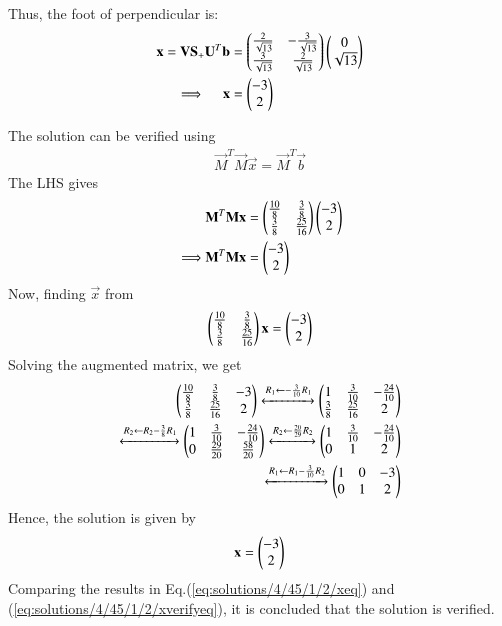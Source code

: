 Thus, the foot of perpendicular is:
\begin{align}
\mathbf{x} = \mathbf{V}\mathbf{S}_{+}\mathbf{U}^T\mathbf{b} 
	&= \begin{pmatrix}\frac{2}{\sqrt{13}} & -\frac{3}{\sqrt{13}} \\
		\frac{3}{\sqrt{13}} & \frac{2}{\sqrt{13}} \end{pmatrix}
	  \begin{pmatrix} 0 \\ \sqrt{13} \end{pmatrix}
	\\
	\implies \quad
\mathbf{x} &= \begin{pmatrix} -3 \\ 2 \end{pmatrix}  	\label{eq:solutions/4/45/1/2/xeq}
\end{align}

The solution can be verified using
\begin{align}
	\vec{M}^T\vec{M}\vec{x} = \vec{M}^T\vec{b}
\end{align}
The LHS gives
\begin{align}
	& \mathbf{M}^T\mathbf{M}\mathbf{x} 
	= \begin{pmatrix}\frac{10}{8} & \frac{3}{8} \\ \frac{3}{8} & \frac{25}{16} \end{pmatrix}
	\begin{pmatrix}-3 \\ 2\end{pmatrix} \\
	\implies
	& \mathbf{M}^T\mathbf{M}\mathbf{x} = \begin{pmatrix}-3 \\ 2\end{pmatrix} 
\end{align}
Now, finding $\vec{x}$ from 
\begin{align}
	\begin{pmatrix}\frac{10}{8} & \frac{3}{8} \\ \frac{3}{8} & \frac{25}{16} \end{pmatrix}
	\mathbf{x} = \begin{pmatrix}-3 \\ 2\end{pmatrix} 
\end{align}
Solving the augmented matrix, we get
\begin{align}
     \begin{pmatrix}\frac{10}{8} & \frac{3}{8} & -3 \\ \frac{3}{8} & \frac{25}{16} & 2\end{pmatrix}
	\xleftrightarrow[]{R_1 \leftarrow -\frac{3}{10}R_1}
     \begin{pmatrix}1 & \frac{3}{10} &-\frac{24}{10} \\ \frac{3}{8} & \frac{25}{16} & 2\end{pmatrix}
	\\
	\xleftrightarrow[]{R_2 \leftarrow R_2-\frac{3}{8}R_1}
	\begin{pmatrix}1 & \frac{3}{10} &-\frac{24}{10} \\ 
		0 & \frac{29}{20} & \frac{58}{20} \end{pmatrix}
	\xleftrightarrow[]{R_2 \leftarrow \frac{20}{29}R_2} \begin{pmatrix}1 & \frac{3}{10} &-\frac{24}{10} \\ 0 & 1 & 2 \end{pmatrix} \\
	\xleftrightarrow[]{R_1 \leftarrow R_1-\frac{3}{10}R_2}
	\begin{pmatrix}1 & 0 & -3 \\ 0 & 1 & 2\end{pmatrix}
\end{align}
Hence, the solution is given by
\begin{align}
	\mathbf{x} = \begin{pmatrix} -3 \\ 2 \end{pmatrix} 	\label{eq:solutions/4/45/1/2/xverifyeq}
\end{align}
Comparing the results in Eq.(\ref{eq:solutions/4/45/1/2/xeq}) and (\ref{eq:solutions/4/45/1/2/xverifyeq}), it is
concluded that the solution is verified.

